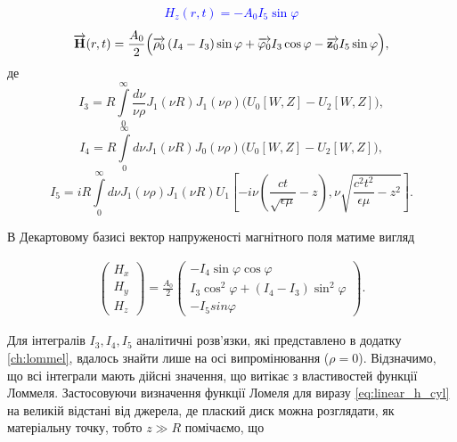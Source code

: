 %
\textcolor{blue} { \begin{equation*} \begin{aligned}
H_z \left( r, t \right) = - A_0 I_5 \sin \varphi
\end{aligned} \end{equation*} }
%
\begin{equation} \label{eq:linear_h_cyl}
\overrightarrow{\mathbf H} (r, t) = \frac{A_0}{2} \Big( 
\overrightarrow{\mathbf \rho_0} \left( I_4 - I_3 \right) \sin \varphi +
\overrightarrow{\mathbf \varphi_0} I_3 \cos \varphi -
\overrightarrow{\mathbf z_0} I_5 \sin \varphi \Big),
\end{equation}
%
де 
%
\begin{equation*}
I_3 = R \int \limits_{0}^{\infty}
\frac{d\nu}{\nu \rho} J_1(\nu R) J_1(\nu \rho)
\Big( U_0[ W, Z ] - U_2[ W, Z ] \Big),
\end{equation*}
%
\begin{equation*}
I_4 = R \int \limits_{0}^{\infty} d\nu J_1(\nu R) J_0(\nu \rho)
\Big( U_0[ W, Z ] - U_2[ W, Z ] \Big),
\end{equation*}
%
\begin{equation*}
I_5 = i R \int \limits_0^\infty 
d \nu J_1(\nu \rho) J_1 (\nu R)
U_1 \left[ -i \nu \left( \frac{ct}{\sqrt{\epsilon \mu}} - z \right), 
\nu \sqrt{\frac{c^2t^2}{\epsilon \mu}-z^2} \right].
\end{equation*}

В Декартовому базисі вектор напруженості магнітного поля матиме вигляд

\begin{equation} \begin{aligned} \label{eq:Hxyz}
\left( \begin{array}{c} H_x \\ H_y \\ H_z \end{array} \right) = 
\frac{A_0}{2} \left( \begin{array}{c}
- I_4 \sin \varphi \cos \varphi \\
I_3 \cos^2 \varphi + (I_4 - I_3) \sin^2 \varphi \\
- I_5 sin \varphi
\end{array} \right).
\end{aligned} \end{equation}

Для інтегралів $ I_3, I_4, I_5 $ аналітичні розв'язки, які представлено в 
додатку \ref{ch:lommel}, вдалось знайти лише на осі випромінювання 
($ \rho = 0 $). Відзначимо, що всі інтеграли мають дійсні значення, що витікає
з властивостей функції Ломмеля. Застосовуючи визначення функції Ломеля для  
виразу \eqref{eq:linear_h_cyl} на великій відстані від джерела, де плаский 
диск можна розглядати, як матеріальну точку, тобто $ z \gg R $ помічаємо, що 

